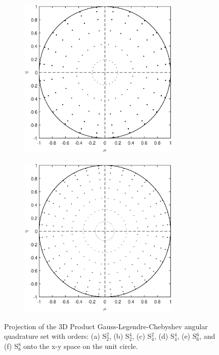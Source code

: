 \begin{figure}
\begin{subfigure}[b]{0.46\textwidth}
	\end{subfigure}
	\vfill
	\begin{subfigure}[b]{0.46\textwidth}
		\centering
		\includegraphics[width=0.85\textwidth]{figures/sec_Sn/PGLC6_6_2D.eps}
		\caption{}
	\end{subfigure}
	\hfill
	\begin{subfigure}[b]{0.46\textwidth}
		\centering
		\includegraphics[width=0.85\textwidth]{figures/sec_Sn/PGLC8_8_2D.eps}
		\caption{}
	\end{subfigure}
\caption{Projection of the 3D Product Gauss-Legendre-Chebyshev angular quadrature set with orders: (a) S$_2^2$, (b) S$_2^4$, (c) S$_4^2$, (d) S$_4^4$, (e) S$_6^6$, and (f) S$_8^8$ onto the x-y space on the unit circle.}
\label{fig::Sn_Angle_PGLC_Quads_2D}
\end{figure}


